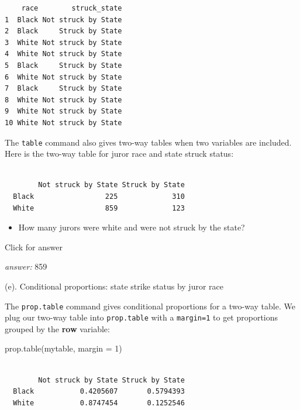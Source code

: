 \documentclass[
]{book}
\newenvironment{Shaded}{\begin{snugshade}}{\end{snugshade}}
\newcommand{\AttributeTok}[1]{\textcolor[rgb]{0.77,0.63,0.00}{#1}}
\newcommand{\DecValTok}[1]{\textcolor[rgb]{0.00,0.00,0.81}{#1}}
\newcommand{\FunctionTok}[1]{\textcolor[rgb]{0.00,0.00,0.00}{#1}}
\newcommand{\NormalTok}[1]{#1}
\newcommand{\OtherTok}[1]{\textcolor[rgb]{0.56,0.35,0.01}{#1}}
\newcommand{\SpecialCharTok}[1]{\textcolor[rgb]{0.00,0.00,0.00}{#1}}
\providecommand{\tightlist}{%
  \setlength{\itemsep}{0pt}\setlength{\parskip}{0pt}}
\begin{document}
\begin{verbatim}
    race        struck_state
1  Black Not struck by State
2  Black     Struck by State
3  White Not struck by State
4  White Not struck by State
5  Black     Struck by State
6  White Not struck by State
7  Black     Struck by State
8  White Not struck by State
9  White Not struck by State
10 White Not struck by State
\end{verbatim}

The \texttt{table} command also gives two-way tables when two variables are included. Here is the two-way table for juror race and state struck status:

\begin{Shaded}
\end{Shaded}

\begin{verbatim}
       
        Not struck by State Struck by State
  Black                 225             310
  White                 859             123
\end{verbatim}

\begin{itemize}
\tightlist
\item
  How many jurors were white and were not struck by the state?
\end{itemize}

Click for answer

\emph{answer:} 859

(e). Conditional proportions: state strike status by juror race

The \texttt{prop.table} command gives conditional proportions for a two-way table. We plug our two-way table into \texttt{prop.table} with a \texttt{margin=1} to get proportions grouped by the \textbf{row} variable:

\begin{Shaded}
\begin{Highlighting}[]
\FunctionTok{prop.table}\NormalTok{(mytable, }\AttributeTok{margin =} \DecValTok{1}\NormalTok{)}
\end{Highlighting}
\end{Shaded}

\begin{verbatim}
       
        Not struck by State Struck by State
  Black           0.4205607       0.5794393
  White           0.8747454       0.1252546
\end{verbatim}
\end{document}
